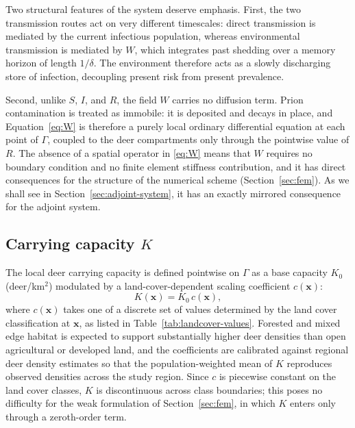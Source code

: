 \documentclass[11pt]{article}
\begin{document}
Two structural features of the system deserve emphasis. First, the two transmission routes act on very different timescales: direct transmission is mediated by the current infectious population, whereas environmental transmission is mediated by $W$, which integrates past shedding over a memory horizon of length $1/\delta$. The environment therefore acts as a slowly discharging store of infection, decoupling present risk from present prevalence.

Second, unlike $S$, $I$, and $R$, the field $W$ carries no diffusion term. Prion contamination is treated as immobile: it is deposited and decays in place, and Equation~\eqref{eq:W} is therefore a purely local ordinary differential equation at each point of $\Gamma$, coupled to the deer compartments only through the pointwise value of $R$. The absence of a spatial operator in \eqref{eq:W} means that $W$ requires no boundary condition and no finite element stiffness contribution, and it has direct consequences for the structure of the numerical scheme (Section~\ref{sec:fem}). As we shall see in Section~\ref{sec:adjoint-system}, it has an exactly mirrored consequence for the adjoint system.

\subsection{Carrying capacity \texorpdfstring{$K$}{K}}
\label{sec:carrying}

The local deer carrying capacity is defined pointwise on $\Gamma$ as a base capacity $K_0$ (deer/km$^2$) modulated by a land-cover-dependent scaling coefficient $c(\mathbf{x})$:
\begin{equation}
  K(\mathbf{x}) = K_0\, c(\mathbf{x}),
  \label{eq:K}
\end{equation}
where $c(\mathbf{x})$ takes one of a discrete set of values determined by the land cover classification at $\mathbf{x}$, as listed in Table~\ref{tab:landcover-values}. Forested and mixed edge habitat is expected to support substantially higher deer densities than open agricultural or developed land, and the coefficients are calibrated against regional deer density estimates so that the population-weighted mean of $K$ reproduces observed densities across the study region. Since $c$ is piecewise constant on the land cover classes, $K$ is discontinuous across class boundaries; this poses no difficulty for the weak formulation of Section~\ref{sec:fem}, in which $K$ enters only through a zeroth-order term.
\end{document}
